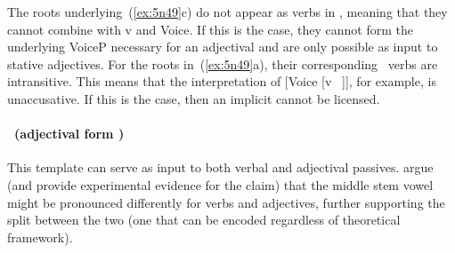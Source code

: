 \begin{exe}
\begin{xlist}
\begin{exe}
\begin{xlist}
\begin{exe}
\begin{exe}
\begin{xlist}
\begin{exe}
\begin{exe}
\begin{xlist}
\begin{exe}
\begin{xlist}
\begin{exe}
\begin{xlist}
\begin{exe}
\begin{xlist}
\begin{exe}
\begin{xlist}
\begin{xlist}
\begin{exe}
\begin{xlist}
\begin{exe}
\begin{xlist}
\begin{exe}
\begin{exe}
\begin{exe}
\begin{xlist}
\begin{exe}
\begin{exe}
\begin{xlist}
\begin{exe}
\begin{xlist}
\begin{exe}
\begin{xlist}
\begin{exe}
\begin{xlist}
\begin{xlist}
\begin{exe}
\begin{xlist}
\begin{exe}
\begin{xlist}
\begin{exe}
\begin{xlist}
\begin{exe}
\begin{xlist}
\begin{exe}
\begin{exe}
\begin{exe}
\begin{exe}
\begin{exe}
\begin{xlist}
\begin{xlist}
\begin{exe}
\begin{xlist}
\begin{exe}
\begin{xlist}
\begin{exe}
\begin{exe}
\begin{exe}
\begin{xlist}
The roots underlying~(\ref{ex:5n49}c) do not appear as verbs in \tkal, meaning that they cannot combine with v and Voice. If this is the case, they cannot form the underlying VoiceP necessary for an adjectival  and are only possible as input to stative adjectives. For the roots in~(\ref{ex:5n49}a), their corresponding \tkal~verbs are intransitive. This means that the interpretation of [Voice [v ~\!]], for example, is unaccusative. If this is the case, then an implicit  cannot be licensed.


\paragraph*{\tpie~(adjectival form \mpua)}
This template can serve as input to both verbal and adjectival passives. \cite{lakscohen16} argue (and provide experimental evidence for the claim) that the middle stem vowel might be pronounced differently for verbs and adjectives, further supporting the split between the two (one that can be encoded regardless of theoretical framework).


\end{xlist}
\end{exe}
\end{exe}
\end{exe}
\end{xlist}
\end{exe}
\end{xlist}
\end{exe}
\end{xlist}
\end{xlist}
\end{exe}
\end{exe}
\end{exe}
\end{exe}
\end{exe}
\end{xlist}
\end{exe}
\end{xlist}
\end{exe}
\end{xlist}
\end{exe}
\end{xlist}
\end{exe}
\end{xlist}
\end{xlist}
\end{exe}
\end{xlist}
\end{exe}
\end{xlist}
\end{exe}
\end{xlist}
\end{exe}
\end{exe}
\end{xlist}
\end{exe}
\end{exe}
\end{exe}
\end{xlist}
\end{exe}
\end{xlist}
\end{exe}
\end{xlist}
\end{xlist}
\end{exe}
\end{xlist}
\end{exe}
\end{xlist}
\end{exe}
\end{xlist}
\end{exe}
\end{xlist}
\end{exe}
\end{exe}
\end{xlist}
\end{exe}
\end{exe}
\end{xlist}
\end{exe}
\end{xlist}
\end{exe}
